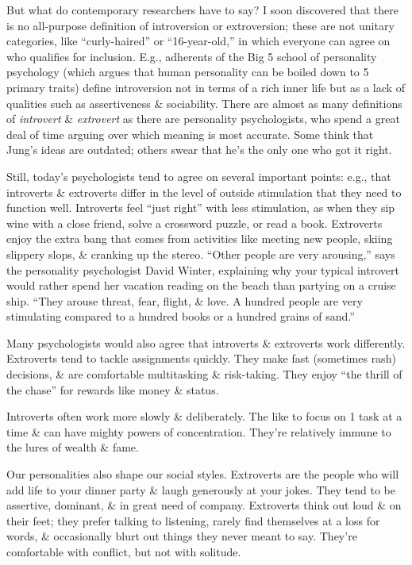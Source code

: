 \documentclass{article}
\numberwithin{equation}{section}
\begin{document}
But what do contemporary researchers have to say? I soon discovered that there is no all-purpose definition of introversion or extroversion; these are not unitary categories, like ``curly-haired'' or ``16-year-old,'' in which everyone can agree on who qualifies for inclusion. E.g., adherents of the Big 5 school of personality psychology (which argues that human personality can be boiled down to 5 primary traits) define introversion not in terms of a rich inner life but as a lack of qualities such as assertiveness \& sociability. There are almost as many definitions of \textit{introvert} \& \textit{extrovert} as there are personality psychologists, who spend a great deal of time arguing over which meaning is most accurate. Some think that Jung's ideas are outdated; others swear that he's the only one who got it right.

Still, today's psychologists tend to agree on several important points: e.g., that introverts \& extroverts differ in the level of outside stimulation that they need to function well. Introverts feel ``just right'' with less stimulation, as when they sip wine with a close friend, solve a crossword puzzle, or read a book. Extroverts enjoy the extra bang that comes from activities like meeting new people, skiing slippery slops, \& cranking up the stereo. ``Other people are very arousing,'' says the personality psychologist David Winter, explaining why your typical introvert would rather spend her vacation reading on the beach than partying on a cruise ship. ``They arouse threat, fear, flight, \& love. A hundred people are very stimulating compared to a hundred books or a hundred grains of sand.''

Many psychologists would also agree that introverts \& extroverts work differently. Extroverts tend to tackle assignments quickly. They make fast (sometimes rash) decisions, \& are comfortable multitasking \& risk-taking. They enjoy ``the thrill of the chase'' for rewards like money \& status.

Introverts often work more slowly \& deliberately. The like to focus on 1 task at a time \& can have mighty powers of concentration. They're relatively immune to the lures of wealth \& fame.

Our personalities also shape our social styles. Extroverts are the people who will add life to your dinner party \& laugh generously at your jokes. They tend to be assertive, dominant, \& in great need of company. Extroverts think out loud \& on their feet; they prefer talking to listening, rarely find themselves at a loss for words, \& occasionally blurt out things they never meant to say. They're comfortable with conflict, but not with solitude.
\end{document}
